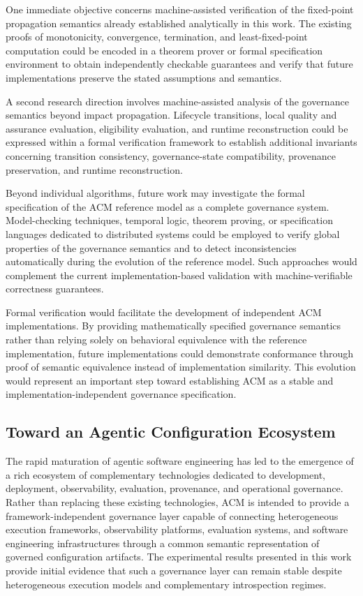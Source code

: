\documentclass[10pt]{article}
\begin{document}
One immediate objective concerns machine-assisted verification of the fixed-point propagation semantics already established analytically in this work. The existing proofs of monotonicity, convergence, termination, and least-fixed-point computation could be encoded in a theorem prover or formal specification environment to obtain independently checkable guarantees and verify that future implementations preserve the stated assumptions and semantics.

A second research direction involves machine-assisted analysis of the governance semantics beyond impact propagation. Lifecycle transitions, local quality and assurance evaluation, eligibility evaluation, and runtime reconstruction could be expressed within a formal verification framework to establish additional invariants concerning transition consistency, governance-state compatibility, provenance preservation, and runtime reconstruction.

Beyond individual algorithms, future work may investigate the formal specification of the ACM reference model as a complete governance system. Model-checking techniques, temporal logic, theorem proving, or specification languages dedicated to distributed systems could be employed to verify global properties of the governance semantics and to detect inconsistencies automatically during the evolution of the reference model. Such approaches would complement the current implementation-based validation with machine-verifiable correctness guarantees.

Formal verification would facilitate the development of independent ACM implementations. By providing mathematically specified governance semantics rather than relying solely on behavioral equivalence with the reference implementation, future implementations could demonstrate conformance through proof of semantic equivalence instead of implementation similarity. This evolution would represent an important step toward establishing ACM as a stable and implementation-independent governance specification.

\subsection{Toward an Agentic Configuration Ecosystem}
\label{sec:future_ecosystem}

The rapid maturation of agentic software engineering has led to the emergence of a rich ecosystem of complementary technologies dedicated to development, deployment, observability, evaluation, provenance, and operational governance. Rather than replacing these existing technologies, ACM is intended to provide a framework-independent governance layer capable of connecting heterogeneous execution frameworks, observability platforms, evaluation systems, and software engineering infrastructures through a common semantic representation of governed configuration artifacts. The experimental results presented in this work provide initial evidence that such a governance layer can remain stable despite heterogeneous execution models and complementary introspection regimes.
\end{document}
